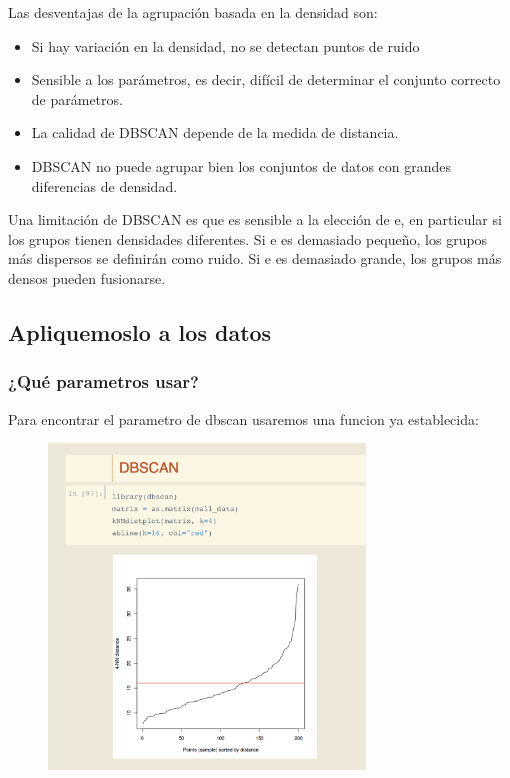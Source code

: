 \documentclass[12pt, fleqn]{report}                             %
\theoremstyle{break}                                            %
\begin{document}
        Las desventajas de la agrupación basada en la densidad son:
        \begin{itemize}
            \item Si hay variación en la densidad, no se detectan puntos de ruido
            \item Sensible a los parámetros, es decir, difícil de determinar el conjunto correcto de parámetros.
            \item La calidad de DBSCAN depende de la medida de distancia.
            \item DBSCAN no puede agrupar bien los conjuntos de datos con grandes diferencias de densidad.
        \end{itemize}
        
        Una limitación de DBSCAN es que es sensible a la elección de e, en particular si los 
        grupos tienen densidades diferentes. Si e es demasiado pequeño, los grupos más dispersos 
        se definirán como ruido. Si e es demasiado grande, los grupos más densos pueden fusionarse.

        \clearpage
        \subsection{Apliquemoslo a los datos}   

            \subsubsection{¿Qué parametros usar?}

            Para encontrar el parametro de dbscan usaremos una funcion ya establecida:
            \begin{figure}[ht!]
                \centering
                \includegraphics[width=0.75\textwidth]{d1}
            \end{figure}
\end{document}
